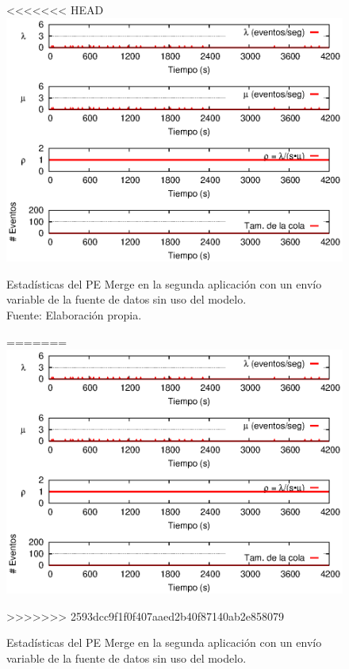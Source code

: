 \begin{figure}[!ht]
<<<<<<< HEAD
    \centering
    \captionsetup{justification=centering}
    \includegraphics[scale=1]{images/exp/app2/normal/sm/statusMergePE.eps}
    \caption[Estadísticas del PE Merge en la segunda aplicación con un envío variable de la fuente de datos sin uso del modelo.]{Estadísticas del PE Merge en la segunda aplicación con un envío variable de la fuente de datos sin uso del modelo.\\Fuente: Elaboración propia.}
=======
\centering
    \includegraphics[scale=1.1]{images/exp/app2/normal/sm/statusMergePE.eps}
    \caption{Estad\'isticas del PE Merge en la segunda aplicaci\'on con un env\'io variable de la fuente de datos sin uso del modelo.}
>>>>>>> 2593dcc9f1f0f407aaed2b40f87140ab2e858079
    \label{fig:app2-normal-statusMergePE-sm}
\end{figure}

